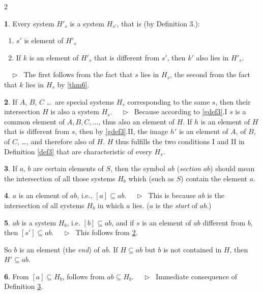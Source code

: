 \documentclass[leqno,hidelinks,10pt]{article}
\theoremstyle{definition}
\newtheorem{satz}{\protect\satzname}
\newtheorem{deff}[satz]{\protect\deffname}
\newcommand{\satzname}{}
\newcommand{\deffname}{}
\renewcommand{\satzname}{\hspace{-4pt}.\ Satz}%
\renewcommand{\deffname}{\hspace{-4pt}.\ Definition}%
\renewcommand{\satzname}{\hspace{-4pt}.\ Theorem}%
\renewcommand{\deffname}{\hspace{-4pt}.\ Definition}%
\newcommand\Beweis{\medskip \newline $ \phantom{'.'} \rhd \ $}%
\newcommand\beweis{ $ \phantom{'.'} \rhd \ $}%
\newcommand{\partof}{\subseteq}
\newcommand{\sref}[1]{\underline{\ref{#1}}}%
\begin{document}
\begin{paracol}{2}
\begin{rightcolumn}
\begin{satz}\label{thm7}
Every system $H'_s$ is a system $H_{s'}$, that is (by Definition 3.):
\begin{enumerate}[I$'$.]
    \item $s'$ is element of $H'_s$
    \item If $k$ is an element of $H'_s$ that is different from $s'$, then $k'$
    also lies in $H'_s$.
\end{enumerate}
\beweis
The first follows from the fact that $s$ lies in $H_s$, the second from the fact
that $k$ lies in $H_s$ by \sref{thm6}.
\end{satz}

\begin{satz}\label{thm8}
If $A$, $B$, $C$ \ldots\ are special systems $H_s$ corresponding to the same $s$,
then their intersection $H$ is also a system $H_s$.
\Beweis
Because according to \sref{gdef3}.I $s$ is a common element of
$A, B, C, \ldots$, thus also an element of $H$. If $h$ is an element of $H$ that
is different from $s$, then by \sref{gdef3}.II, the image $h'$
is an element of $A$, of $B$, of $C$, \ldots, and therefore also of $H$. $H$ thus
fulfills the two conditions I and II in Definition \sref{def3} that are
characteristic of every $H_s$.
\end{satz}

\begin{deff}\label{def9}
If $a$, $b$ are certain elements of $S$, then the symbol $ab$ (\emph{section} $ab$)
should mean the intersection of all those systems $H_b$ which (such as $S$)
contain the element $a$.%
\end{deff}

\newpage
\begin{satz}\label{thm10}
$a$ is an element of $ab$, i.e., $[a] \partof ab$.
\Beweis
This is because $ab$ is the intersection of all systems $H_b$ in which $a$ lies.
($a$ is the \emph{start} of $ab$.)
\end{satz}

\begin{satz}\label{thm11}
$ab$ is a system $H_b$, i.e. $[b] \partof ab$, and if $s$ is an element of $ab$
different from $b$, then $[s'] \partof ab$.
\Beweis
This follows from \sref{thm8}.
\end{satz}

So $b$ is an element (the \emph{end}) of $ab$. If $H \partof ab$ but $b$ is not
contained in $H$, then $H' \partof ab$.

\begin{satz}\label{thm12}
From $[a] \partof H_b$, follows from $ab \partof H_b$.
\Beweis
Immediate consequence of Definition \sref{def9}.
\end{satz}


\end{rightcolumn}
\end{paracol}
\end{document}
